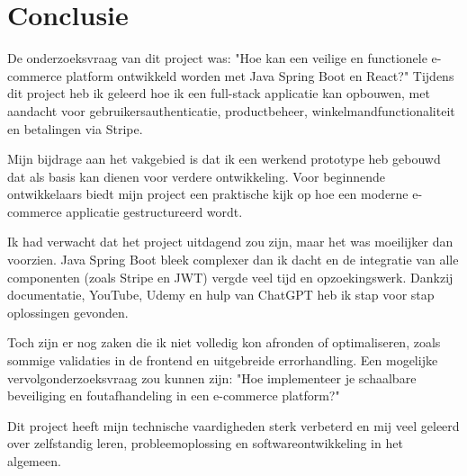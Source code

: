 
\chapter{Conclusie}%
\label{ch:conclusie}


De onderzoeksvraag van dit project was: "Hoe kan een veilige en functionele e-commerce platform ontwikkeld worden met Java Spring Boot en React?" Tijdens dit project heb ik geleerd hoe ik een full-stack applicatie kan opbouwen, met aandacht voor gebruikersauthenticatie, productbeheer, winkelmandfunctionaliteit en betalingen via Stripe.

Mijn bijdrage aan het vakgebied is dat ik een werkend prototype heb gebouwd dat als basis kan dienen voor verdere ontwikkeling. Voor beginnende ontwikkelaars biedt mijn project een praktische kijk op hoe een moderne e-commerce applicatie gestructureerd wordt.

Ik had verwacht dat het project uitdagend zou zijn, maar het was moeilijker dan voorzien. Java Spring Boot bleek complexer dan ik dacht en de integratie van alle componenten (zoals Stripe en JWT) vergde veel tijd en opzoekingswerk. Dankzij documentatie, YouTube, Udemy en hulp van ChatGPT heb ik stap voor stap oplossingen gevonden.

Toch zijn er nog zaken die ik niet volledig kon afronden of optimaliseren, zoals sommige validaties in de frontend en uitgebreide errorhandling. Een mogelijke vervolgonderzoeksvraag zou kunnen zijn: "Hoe implementeer je schaalbare beveiliging en foutafhandeling in een e-commerce platform?"

Dit project heeft mijn technische vaardigheden sterk verbeterd en mij veel geleerd over zelfstandig leren, probleemoplossing en softwareontwikkeling in het algemeen.

